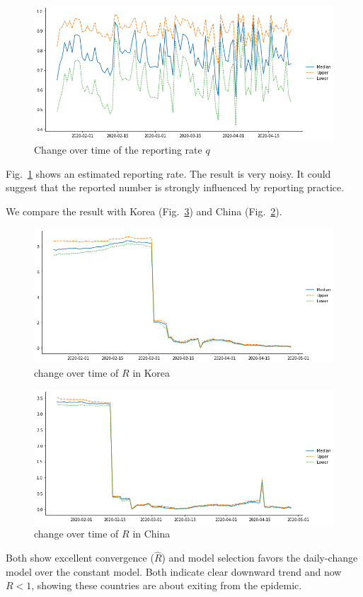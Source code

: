 \documentclass{amsart}
\begin{document}
\begin{figure}[h]
 \centering
 \includegraphics[width=\linewidth]{fig/q-Japan.png}
 \caption{Change over time of the reporting rate $q$}
 \label{fig:q}
\end{figure}

Fig.~\ref{fig:q} shows an estimated reporting rate.
The result is very noisy.
It could suggest that the reported number is strongly influenced by reporting practice.

We compare the result with Korea (Fig.~\ref{fig:R-China}) and China (Fig.~\ref{fig:R-Korea}).
\begin{figure}[h]
    \centering
    \includegraphics[width=\linewidth]{fig/R0-Korea.png}
    \caption{ change over time of $R$ in Korea}
    \label{fig:R-Korea}
\end{figure}
\begin{figure}[h]
    \centering
    \includegraphics[width=\linewidth]{fig/R0-China.png}
    \caption{ change over time of $R$ in China}
    \label{fig:R-China}
\end{figure}
Both show excellent convergence ($\hat{R}$) and model selection favors the daily-change model over the constant model.
Both indicate clear downward trend and now $R < 1$, showing these countries are about exiting from the epidemic.
\end{document}
